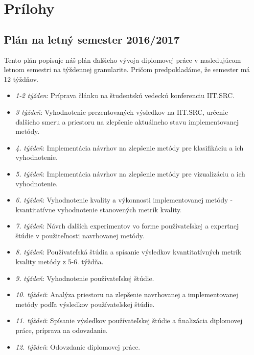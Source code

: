 \label{app.01}
\appendix
\chapter*{Prílohy}
\renewcommand{\thesection}{\Alph{section}}


\section{Plán na letný semester 2016/2017}\label{plan-leto}
Tento plán popisuje náš plán ďalšieho vývoja diplomovej práce v nasledujúcom letnom semestri na týždennej granularite. Pričom predpokladáme, že semester má 12 týždňov.
\begin{itemize}
	\item \textit{1-2 týžden}: Príprava článku na študentskú vedeckú konferenciu IIT.SRC.
	\item \textit{3 týždeň}: Vyhodnotenie prezentovaných výsledkov na IIT.SRC, určenie ďalšieho smeru a priestoru na zlepšenie aktuálneho stavu implementovanej metódy.
	\item \textit{4. týždeň}: Implementácia návrhov na zlepšenie metódy pre klasifikáciu a ich vyhodnotenie.
	\item \textit{5. týždeň}: Implementácia návrhov na zlepšenie metódy pre vizualizáciu a ich vyhodnotenie. 
	\item \textit{6. týždeň}: Vyhodnotenie kvality a výkonnosti implementovanej metódy - kvantitatívne vyhodnotenie stanovených metrík kvality.
	\item \textit{7. týždeň}: Návrh ďalších experimentov vo forme používateľskej a expertnej štúdie v použiteľnosti navrhovanej metódy.
	\item \textit{8. týždeň}: Používateľská štúdia a spísanie výsledkov kvantitatívných metrík kvality metódy z 5-6. týždňa.
	\item \textit{9. týždeň}: Vyhodnotenie používateľskej štúdie.
	\item \textit{10. týždeň}: Analýza priestoru na zlepšenie navrhovanej a implementovanej metódy podľa výsledkov používateľskej štúdie.
	\item \textit{11. týždeň}: Spísanie výsledkov používateľskej štúdie a finalizácia diplomovej práce, príprava na odovzdanie.
	\item \textit{12. týždeň}: Odovzdanie diplomovej práce.
\end{itemize} 

